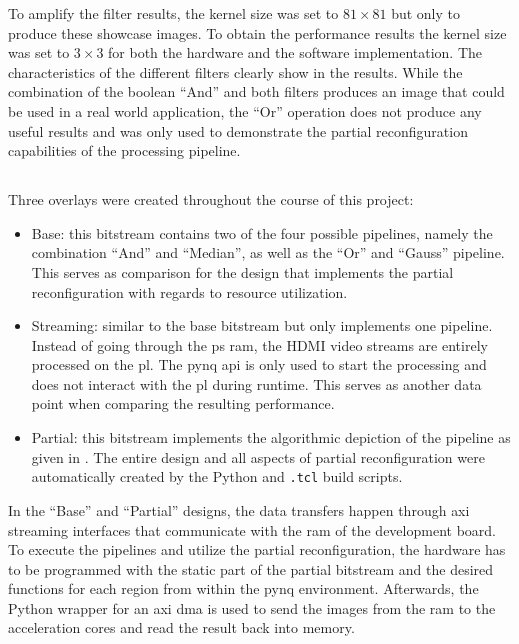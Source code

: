 \documentclass{scrartcl}
\begin{document}
To amplify the filter results, the kernel size was set to $81 \times 81$ but
only to produce these showcase images. To obtain the performance results the
kernel size was set to $3 \times 3$ for both the hardware and the software
implementation. The characteristics of the different filters clearly show in the
results. While the combination of the boolean “And” and both filters produces
an image that could be used in a real world application, the “Or” operation does
not produce any useful results and was only used to demonstrate the partial
reconfiguration capabilities of the processing pipeline.


\subsection{}

Three overlays were created throughout the course of this project:

\begin{itemize}
    \item Base: this bitstream contains two of the four possible pipelines,
        namely the combination “And” and “Median”, as well as the “Or” and
        “Gauss” pipeline. This serves as comparison for the design that
        implements the partial reconfiguration with regards to resource
        utilization.
    \item Streaming: similar to the base bitstream but only implements one
        pipeline. Instead of going through the \gls{ps} \gls{ram}, the HDMI
        video streams are entirely processed on the \gls{pl}. The \gls{pynq}
        \gls{api} is only used to start the processing and does not interact
        with the \gls{pl} during runtime. This serves as another data point when
        comparing the resulting performance.
    \item Partial: this bitstream implements the algorithmic depiction of the
        pipeline as given in . The entire design and all aspects
        of partial reconfiguration were automatically created by the Python and
        \texttt{.tcl} build scripts.
\end{itemize}

In the “Base” and “Partial” designs, the data transfers happen through \gls{axi}
streaming interfaces that communicate with the \gls{ram} of the development
board. To execute the pipelines and utilize the partial reconfiguration, the
hardware has to be programmed with the static part of the partial bitstream and
the desired functions for each region from within the \gls{pynq} environment.
Afterwards, the Python wrapper for an \gls{axi} \gls{dma} is used to send the
images from the \gls{ram} to the acceleration cores and read the result back
into memory.
\end{document}
